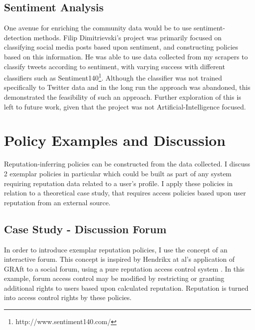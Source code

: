 

\subsection{Sentiment Analysis}

One avenue for enriching the community data would be to use sentiment-detection methods. Filip Dimitrievski's project was primarily focused on classifying social media posts based upon sentiment, and constructing policies based on this information. He was able to use data collected from my scrapers to classify tweets according to sentiment, with varying success with different classifiers such as Sentiment140\footnote{http://www.sentiment140.com/}. Although the classifier was not trained specifically to Twitter data and in the long run the approach was abandoned, this demonstrated the feasibility of such an approach. Further exploration of this is left to future work, given that the project was not Artificial-Intelligence focused.

\section{Policy Examples and Discussion}

Reputation-inferring policies can be constructed from the data collected. I discuss 2 exemplar policies in particular which could be built as part of any system requiring reputation data related to a user's profile. I apply these policies in relation to a theoretical case study, that requires access policies based upon user reputation from an external source. 

\subsection{Case Study - Discussion Forum}

In order to introduce exemplar reputation policies, I use the concept of an interactive forum. This concept is inspired by Hendrikx at al's application of GRAft to a social forum, using a pure reputation access control system \cite{graft_paper}. In this example, forum access control may be modified by restricting or granting additional rights to users based upon calculated reputation. Reputation is turned into access control rights by these policies.

